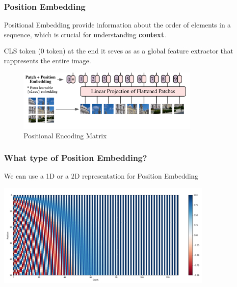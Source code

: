 \begin{frame}
\frametitle{Position Embedding}

Positional Embedding provide information about the order of elements in a sequence, which is crucial for understanding \textbf{context}.

\vspace{0.5cm}

CLS token (0 token) at the end it seves as as a global feature extractor that rappresents the entire image.

\begin{figure}[H]  %
    \begin{center}
        \includegraphics[width=0.8\textwidth]{img/2-section/Posizion enbedding.png}
        \caption{Positional Encoding Matrix}
        \label{fig:positional-encoding-matrix}
    \end{center}
\end{figure}

\end{frame}

\begin{frame}
\frametitle{What type of Position Embedding?}

We can use a 1D or a 2D representation for Position Embedding

\begin{center}
    \includegraphics[width=0.8\textwidth]{img/2-section/positional_encoding.png} 
\end{center}
\end{frame}

